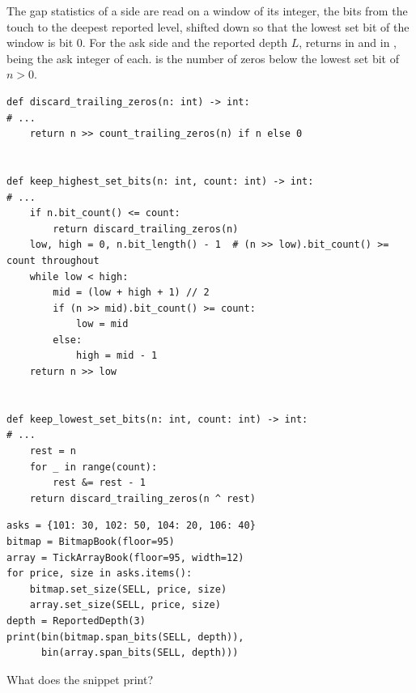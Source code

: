 \begin{question}
\label{question.askWindowsOfTheTwoBitmaps}
The gap statistics of a side are read on a window of its integer,
the bits from the touch to the deepest reported level,
shifted down so that the lowest set bit of the window is bit 0.
For the ask side and the reported depth $L$,  returns
 in 
and  in ,
 being the ask integer of each.
 is the number of zeros below the lowest set bit of $n > 0$.
\begin{lstlisting}[caption={\protect\codehl{unito26.lob.binary\_gaps}: three functions, their docstrings elided.}, label=listing.askWindowsFunctions]
def discard_trailing_zeros(n: int) -> int:
# ...
    return n >> count_trailing_zeros(n) if n else 0


def keep_highest_set_bits(n: int, count: int) -> int:
# ...
    if n.bit_count() <= count:
        return discard_trailing_zeros(n)
    low, high = 0, n.bit_length() - 1  # (n >> low).bit_count() >= count throughout
    while low < high:
        mid = (low + high + 1) // 2
        if (n >> mid).bit_count() >= count:
            low = mid
        else:
            high = mid - 1
    return n >> low


def keep_lowest_set_bits(n: int, count: int) -> int:
# ...
    rest = n
    for _ in range(count):
        rest &= rest - 1
    return discard_trailing_zeros(n ^ rest)
\end{lstlisting}
\begin{lstlisting}[caption={The window of three ask levels, in either book}, label=listing.askWindowsRun]
asks = {101: 30, 102: 50, 104: 20, 106: 40}
bitmap = BitmapBook(floor=95)
array = TickArrayBook(floor=95, width=12)
for price, size in asks.items():
    bitmap.set_size(SELL, price, size)
    array.set_size(SELL, price, size)
depth = ReportedDepth(3)
print(bin(bitmap.span_bits(SELL, depth)),
      bin(array.span_bits(SELL, depth)))
\end{lstlisting}
What does the snippet print?
\begin{choices}
 \choice {}
 \choice {}
 \choice {}
 \correctchoice {}
 \choice {}
\end{choices}
\end{question}


